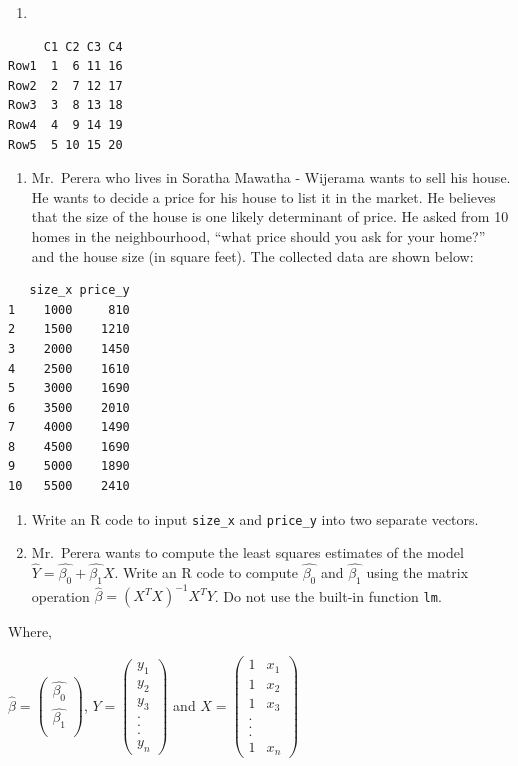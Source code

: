 \documentclass[
  letterpaper,
  DIV=11,
  numbers=noendperiod]{scrreprt}
\providecommand{\tightlist}{%
  \setlength{\itemsep}{0pt}\setlength{\parskip}{0pt}}\usepackage{longtable,booktabs,array}
\begin{document}
\begin{enumerate}
\def\labelenumi{\alph{enumi}.}
\setcounter{enumi}{2}
\tightlist
\item
\end{enumerate}

\begin{verbatim}
     C1 C2 C3 C4
Row1  1  6 11 16
Row2  2  7 12 17
Row3  3  8 13 18
Row4  4  9 14 19
Row5  5 10 15 20
\end{verbatim}

\begin{enumerate}
\def\labelenumi{\arabic{enumi}.}
\setcounter{enumi}{1}
\tightlist
\item
  Mr.~Perera who lives in Soratha Mawatha - Wijerama wants to sell his
  house. He wants to decide a price for his house to list it in the
  market. He believes that the size of the house is one likely
  determinant of price. He asked from 10 homes in the neighbourhood,
  ``what price should you ask for your home?'' and the house size (in
  square feet). The collected data are shown below:
\end{enumerate}

\begin{verbatim}
   size_x price_y
1    1000     810
2    1500    1210
3    2000    1450
4    2500    1610
5    3000    1690
6    3500    2010
7    4000    1490
8    4500    1690
9    5000    1890
10   5500    2410
\end{verbatim}

\begin{enumerate}
\def\labelenumi{(\alph{enumi})}
\item
  Write an R code to input \texttt{size\_x} and \texttt{price\_y} into
  two separate vectors.
\item
  Mr.~Perera wants to compute the least squares estimates of the model
  \(\hat{Y} = \hat{\beta_0} + \hat{\beta_1}X\). Write an R code to
  compute \(\hat{\beta_0}\) and \(\hat{\beta_1}\) using the matrix
  operation \(\hat{\beta} = (X^TX)^{-1}X^TY\). Do not use the built-in
  function \texttt{lm}.
\end{enumerate}

Where,

\(\hat{\beta} =\begin{pmatrix}
\hat{\beta_0} \\
\hat{\beta_1} \\
\end{pmatrix}\), \(Y =
\begin{pmatrix}
y_1 \\
y_2 \\
y_3 \\
. \\
. \\
. \\
y_n
\end{pmatrix}\) and \(X =
\begin{pmatrix}
1 & x_1 \\
1 & x_2 \\
1 & x_3 \\
. \\
. \\
. \\
1 & x_n
\end{pmatrix}\)
\end{document}
